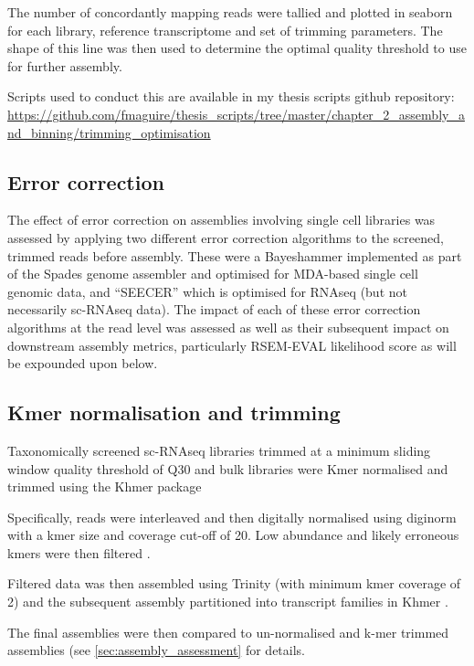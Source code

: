 The number of concordantly mapping reads were tallied and plotted in seaborn 
for each library, reference transcriptome and set of trimming parameters.
The shape of this line was then used to determine the optimal quality 
threshold to use for further assembly.

Scripts used to conduct this are available in my thesis scripts github repository:
\url{https://github.com/fmaguire/thesis_scripts/tree/master/chapter_2_assembly_and_binning/trimming_optimisation}


\subsection{Error correction}

The effect of error correction on assemblies involving single cell libraries was assessed 
by applying two different error correction algorithms to the screened, trimmed reads before assembly.
These were a Bayeshammer \citep{Nikolenko2013} implemented as part of the Spades 
genome assembler \citep{Bankevich2012} and optimised for MDA-based single cell genomic data, 
and ``SEECER'' \citep{Le2013} which is optimised for RNAseq (but not necessarily sc-RNAseq
data). 
The impact of each of these error correction algorithms at the read level was assessed as well 
as their subsequent impact on downstream assembly metrics, particularly RSEM-EVAL likelihood score
as will be expounded upon below.


\subsection{Kmer normalisation and trimming}

Taxonomically screened sc-RNAseq libraries trimmed at a minimum sliding window quality
threshold of Q30 and bulk libraries were Kmer normalised and trimmed using the Khmer package \citep{Crusoe2015}

Specifically, reads were interleaved \citep{Doring2008} and then digitally normalised using diginorm \citep{Brown2012}
with a kmer size and coverage cut-off of 20.  Low abundance and likely erroneous
kmers were then filtered \citep{Zhang2015,Zhang2014}.  

Filtered data was then assembled using Trinity (with minimum kmer coverage of 2) 
and the subsequent assembly partitioned into transcript families in Khmer \citep{Pell2012}.

The final assemblies were then compared to un-normalised and k-mer trimmed assemblies 
(see \ref{sec:assembly_assessment} for details.

